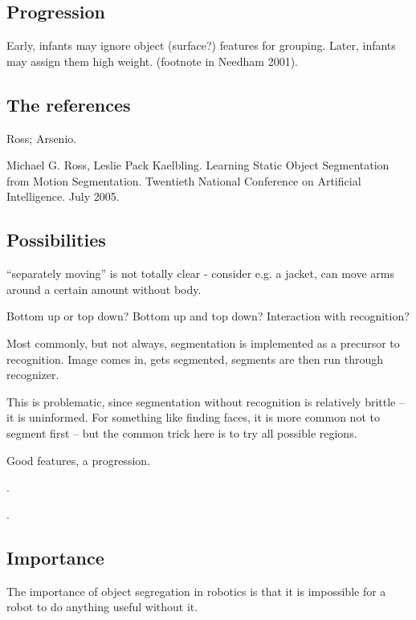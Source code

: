\subsection{Progression}

Early, infants may ignore object (surface?) features for grouping.
Later, infants may assign them high weight. (footnote in
Needham 2001).



\subsection{The references}

Ross; Arsenio.


Michael G. Ross, Leslie Pack Kaelbling. Learning Static Object
Segmentation from Motion Segmentation. Twentieth National Conference
on Artificial Intelligence. July 2005.

\subsection{Possibilities}

``separately moving'' is not totally clear - consider e.g. a 
jacket, can move arms around a certain amount without body.

Bottom up or top down?  Bottom up and top down?  Interaction
with recognition?

Most commonly, but not always, segmentation is implemented
as a precursor to recognition.  Image comes in, gets
segmented, segments are then run through recognizer.

This is problematic, since segmentation without
recognition is relatively brittle -- it is uninformed.
For something like finding faces, it is more common
not to segment first -- but the common trick here
is to try all possible regions.

Good features, a progression.

\cite{swain91color}.

\cite{schiele00recognition}.

\cite{lowe04distinctive}

\cite{felzenszwalb04efficient}

\subsection{Importance}

The importance of object segregation in robotics is 
that it is impossible for a robot to do anything 
useful without it.  

